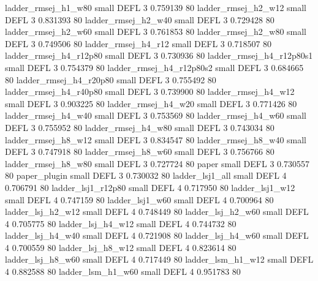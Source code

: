      ladder_rmsej_h1_w80      small     DEFL                 3 0.759139 80
     ladder_rmsej_h2_w12      small     DEFL                 3 0.831393 80
     ladder_rmsej_h2_w40      small     DEFL                 3 0.729428 80
     ladder_rmsej_h2_w60      small     DEFL                 3 0.761853 80
     ladder_rmsej_h2_w80      small     DEFL                 3 0.749506 80
     ladder_rmsej_h4_r12      small     DEFL                 3 0.718507 80
  ladder_rmsej_h4_r12p80      small     DEFL                 3 0.730936 80
ladder_rmsej_h4_r12p80s1      small     DEFL                 3 0.754379 80
ladder_rmsej_h4_r12p80s2      small     DEFL                 3 0.684665 80
  ladder_rmsej_h4_r20p80      small     DEFL                 3 0.755492 80
  ladder_rmsej_h4_r40p80      small     DEFL                 3 0.739900 80
     ladder_rmsej_h4_w12      small     DEFL                 3 0.903225 80
     ladder_rmsej_h4_w20      small     DEFL                 3 0.771426 80
     ladder_rmsej_h4_w40      small     DEFL                 3 0.753569 80
     ladder_rmsej_h4_w60      small     DEFL                 3 0.755952 80
     ladder_rmsej_h4_w80      small     DEFL                 3 0.743034 80
     ladder_rmsej_h8_w12      small     DEFL                 3 0.834547 80
     ladder_rmsej_h8_w40      small     DEFL                 3 0.747918 80
     ladder_rmsej_h8_w60      small     DEFL                 3 0.756766 80
     ladder_rmsej_h8_w80      small     DEFL                 3 0.727724 80
                   paper      small     DEFL                 3 0.730557 80
            paper_plugin      small     DEFL                 3 0.730032 80
         ladder_lsj1_all      small     DEFL                 4 0.706791 80
      ladder_lsj1_r12p80      small     DEFL                 4 0.717950 80
         ladder_lsj1_w12      small     DEFL                 4 0.747159 80
         ladder_lsj1_w60      small     DEFL                 4 0.700964 80
       ladder_lsj_h2_w12      small     DEFL                 4 0.748449 80
       ladder_lsj_h2_w60      small     DEFL                 4 0.705775 80
       ladder_lsj_h4_w12      small     DEFL                 4 0.744732 80
       ladder_lsj_h4_w40      small     DEFL                 4 0.721908 80
       ladder_lsj_h4_w60      small     DEFL                 4 0.700559 80
       ladder_lsj_h8_w12      small     DEFL                 4 0.823614 80
       ladder_lsj_h8_w60      small     DEFL                 4 0.717449 80
       ladder_lsm_h1_w12      small     DEFL                 4 0.882588 80
       ladder_lsm_h1_w60      small     DEFL                 4 0.951783 80
